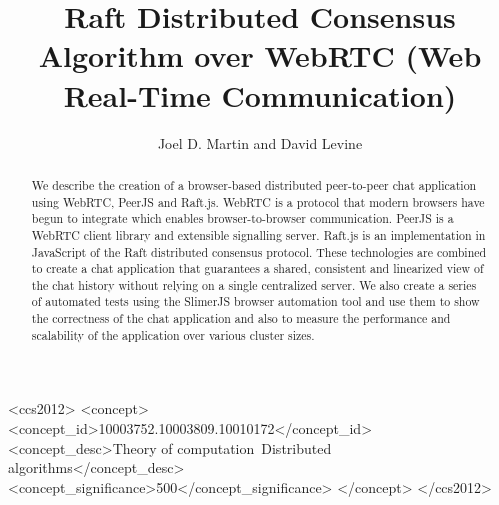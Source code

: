 \documentclass{acmtog} %
\begin{document}

\title{Raft Distributed Consensus Algorithm over WebRTC (Web Real-Time Communication)} %

\author{Joel D. Martin {\upshape and} David Levine
}



%
%
\begin{CCSXML}
    <ccs2012>
    <concept>
    <concept_id>10003752.10003809.10010172</concept_id>
    <concept_desc>Theory of computation~Distributed
    algorithms</concept_desc>
    <concept_significance>500</concept_significance>
    </concept>
    </ccs2012>
\end{CCSXML}


%
%



\maketitle



\begin{abstract}
We describe the creation of a browser-based distributed peer-to-peer
chat application using WebRTC, PeerJS and Raft.js. WebRTC is
a protocol that modern browsers have begun to integrate which enables
browser-to-browser communication. PeerJS is a WebRTC client library
and extensible signalling server. Raft.js is an implementation in
JavaScript of the Raft distributed consensus protocol. These
technologies are combined to create a chat application that guarantees
a shared, consistent and linearized view of the chat history without
relying on a single centralized server. We also create a series of
automated tests using the SlimerJS browser automation tool and use
them to show the correctness of the chat application and also to
measure the performance and scalability of the application over
various cluster sizes.
\end{abstract}
\end{document}
